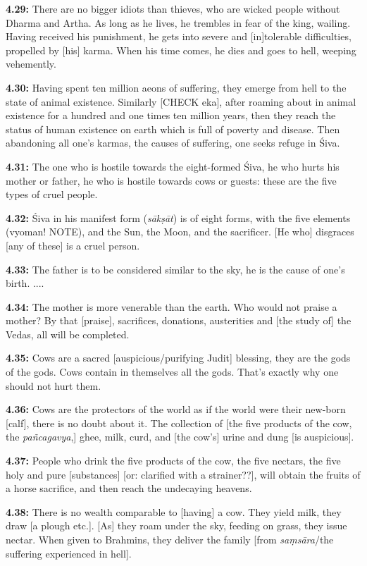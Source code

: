 \documentclass{article}
\newcommand{\vsnum}[1]{\textbf{#1}}
\newcommand{\skt}[1]{\textit{#1}}
\begin{document}
\vsnum{4.29: }There are no bigger idiots than thieves, who are wicked people without Dharma and Artha. As long as he lives, he trembles in fear of the king, wailing. Having received his punishment, he gets into severe and [in]tolerable difficulties, propelled by [his] karma. When his time comes, he dies and goes to hell, weeping vehemently.

\vsnum{4.30: }Having spent ten million aeons of suffering, they emerge from hell to the state of animal existence. Similarly [CHECK eka], after roaming about in animal existence for a hundred and one times ten million years, then they reach the status of human existence on earth which is full of poverty and disease. Then abandoning all one's karmas, the causes of suffering, one seeks refuge in Śiva.

\vsnum{4.31: }The one who is hostile towards the eight-formed Śiva, he who hurts his mother or father, he who is hostile towards cows or guests: these are the five types of cruel people.

\vsnum{4.32: }Śiva in his manifest form (\skt{sākṣāt}) is of eight forms, with the five elements (vyoman! NOTE), and the Sun, the Moon, and the sacrificer. [He who] disgraces [any of these] is a cruel person.

\vsnum{4.33: }The father is to be considered similar to the sky, he is the cause of one's birth. .... 

\vsnum{4.34: }The mother is more venerable than the earth. Who would not praise a mother? By that [praise], sacrifices, donations, austerities and [the study of] the Vedas, all will be completed.

\vsnum{4.35: }Cows are a sacred [auspicious/purifying Judit] blessing, they are the gods of the gods. Cows contain in themselves all the gods. That's exactly why one should not hurt them.

\vsnum{4.36: }Cows are the protectors of the world as if the world were their new-born [calf], there is no doubt about it. The collection of [the five products of the cow, the \skt{pañcagavya},] ghee, milk, curd, and [the cow's] urine and dung [is auspicious].

\vsnum{4.37: }People who drink the five products of the cow, the five nectars, the five holy and pure [substances] [or: clarified with a strainer??], will obtain the fruits of a horse sacrifice, and then reach the undecaying heavens.

\vsnum{4.38: }There is no wealth comparable to [having] a cow. They yield milk, they draw [a plough etc.]. [As] they roam under the sky, feeding on grass, they issue nectar. When given to Brahmins, they deliver the family [from \skt{saṃsāra}/the suffering experienced in hell].
\end{document}
